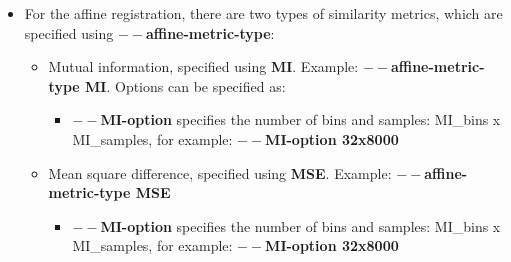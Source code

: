\begin{itemize}
\begin{itemize}
    \end{itemize}


 \item For the affine registration, there are two types of similarity metrics, which are specified using \textbf{$--$affine-metric-type}:
    
    \begin{itemize}
     
    \item Mutual information, specified using \textbf{MI}.
         Example: \textbf{$--$affine-metric-type MI}. Options can be specified as:         
           
         \begin{itemize}
            \item \textbf{$--$MI-option} specifies the number of bins and samples: MI\_bins x MI\_samples, for example: \textbf{$--$MI-option 32x8000}
         \end{itemize}
    
    \item Mean square difference, specified using \textbf{MSE}.
         Example: \textbf{$--$affine-metric-type MSE}
         \begin{itemize}
            \item \textbf{$--$MI-option} specifies the number of bins and samples: MI\_bins x MI\_samples, for example: \textbf{$--$MI-option 32x8000}
        \end{itemize}


    \end{itemize}

\end{itemize}

